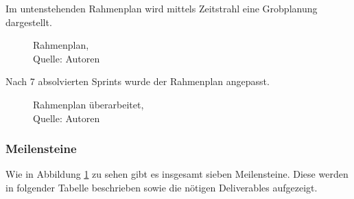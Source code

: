 Im untenstehenden Rahmenplan wird mittels Zeitstrahl eine Grobplanung dargestellt. 

\begin{figure}[H]
    \centering
    \caption[SoDa Rahmenplan]{Rahmenplan,\\ Quelle: Autoren}
    \label{img: SoDa Rahmenplan}
\end{figure}

Nach 7 absolvierten Sprints wurde der Rahmenplan angepasst. 
\begin{figure}[H]
    \centering
    \caption[SoDa Rahmenplan überarbeitet]{Rahmenplan überarbeitet,\\ Quelle: Autoren}
    \label{img: SoDaRahmenplanUeberarbeitet}
\end{figure}
\newpage
\subsubsection{Meilensteine}\label{Meilensteine}
Wie in Abbildung \ref{img: SoDa Rahmenplan} zu sehen gibt es insgesamt sieben Meilensteine.
Diese werden in folgender Tabelle beschrieben sowie die nötigen Deliverables aufgezeigt.


